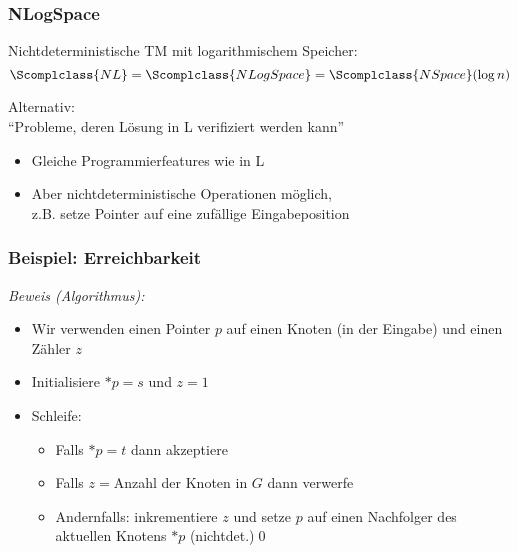 \documentclass[aspectratio=1610,onlymath]{beamer}
\begin{document}
\begin{frame}\frametitle{NLogSpace}

\alert{Nichtdeterministische TM mit logarithmischem Speicher:}
\[
\Scomplclass{NL} = \Scomplclass{NLogSpace} = \Scomplclass{NSpace}(\log n)
\]

\alert{Alternativ:}\\
"`Probleme, deren Lösung in L verifiziert werden kann"'
\bigskip

\begin{itemize}
\item Gleiche Programmierfeatures wie in L
\item Aber nichtdeterministische Operationen möglich,\\ z.B. setze Pointer auf eine zufällige Eingabeposition
\end{itemize}

\end{frame}

\begin{frame}\frametitle{Beispiel: Erreichbarkeit}

\bigskip\pause

\pause

\emph{Beweis (Algorithmus):}
\begin{itemize}
\item Wir verwenden einen Pointer $p$ auf einen Knoten (in der Eingabe) und einen Zähler $z$
\item Initialisiere $*p=s$ und $z=1$
\item Schleife:
\begin{itemize}
\item Falls $*p=t$ dann akzeptiere
\item Falls $z={}$Anzahl der Knoten in $G$ dann verwerfe
\item Andernfalls: inkrementiere $z$ und setze $p$ auf einen Nachfolger des aktuellen Knotens $*p$ (nichtdet.)\qed
\end{itemize}
\end{itemize}

\end{frame}
\end{document}
